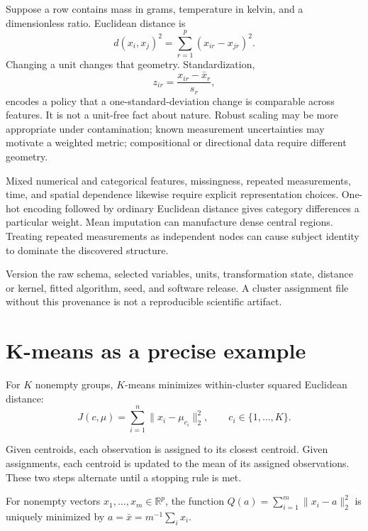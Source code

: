 Suppose a row contains mass in grams, temperature in kelvin, and a dimensionless
ratio. Euclidean distance is
\[
d(x_i,x_j)^2=\sum_{r=1}^{p}(x_{ir}-x_{jr})^2.
\]
Changing a unit changes that geometry. Standardization,
\[
z_{ir}=\frac{x_{ir}-\bar x_r}{s_r},
\]
encodes a policy that a one-standard-deviation change is comparable across
features. It is not a unit-free fact about nature. Robust scaling may be more
appropriate under contamination; known measurement uncertainties may motivate
a weighted metric; compositional or directional data require different
geometry.

Mixed numerical and categorical features, missingness, repeated measurements,
time, and spatial dependence likewise require explicit representation choices.
One-hot encoding followed by ordinary Euclidean distance gives category
differences a particular weight. Mean imputation can manufacture dense central
regions. Treating repeated measurements as independent nodes can cause subject
identity to dominate the discovered structure.

\begin{professionalbox}
Version the raw schema, selected variables, units, transformation state,
distance or kernel, fitted algorithm, seed, and software release. A cluster
assignment file without this provenance is not a reproducible scientific
artifact.
\end{professionalbox}

\section{K-means as a precise example}

For $K$ nonempty groups, $K$-means minimizes within-cluster squared Euclidean
distance:
\begin{equation}
\label{eq:kmeans-objective}
J(c,\mu)=\sum_{i=1}^{n}\lVert x_i-\mu_{c_i}\rVert_2^2,
\qquad c_i\in\{1,\ldots,K\}.
\end{equation}

Given centroids, each observation is assigned to its closest centroid. Given
assignments, each centroid is updated to the mean of its assigned observations.
These two steps alternate until a stopping rule is met.

\begin{theorem}
\label{thm:kmeans-centroid}
For nonempty vectors $x_1,\ldots,x_m\in\mathbb{R}^p$, the function
$Q(a)=\sum_{i=1}^{m}\lVert x_i-a\rVert_2^2$ is uniquely minimized by
$a=\bar x=m^{-1}\sum_i x_i$.
\end{theorem}

